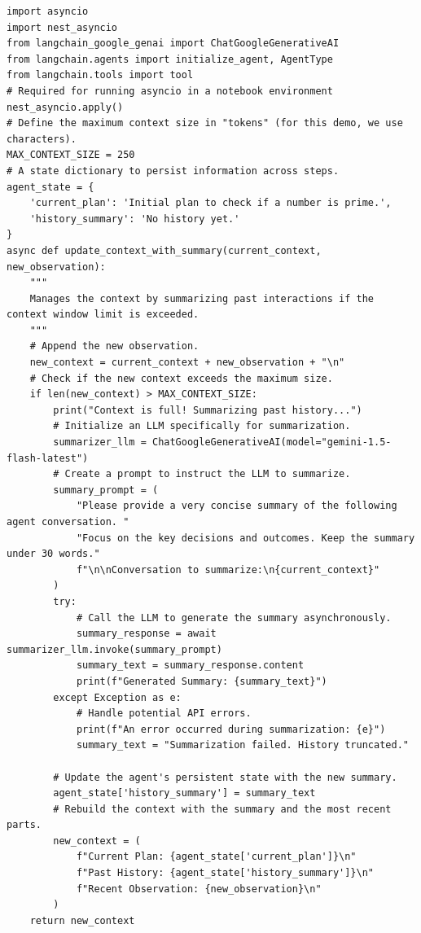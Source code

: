\begin{listing}
\begin{verbatim}
import asyncio
import nest_asyncio
from langchain_google_genai import ChatGoogleGenerativeAI
from langchain.agents import initialize_agent, AgentType
from langchain.tools import tool
# Required for running asyncio in a notebook environment
nest_asyncio.apply()
# Define the maximum context size in "tokens" (for this demo, we use characters).
MAX_CONTEXT_SIZE = 250
# A state dictionary to persist information across steps.
agent_state = {
    'current_plan': 'Initial plan to check if a number is prime.',
    'history_summary': 'No history yet.'
}
async def update_context_with_summary(current_context, new_observation):
    """
    Manages the context by summarizing past interactions if the context window limit is exceeded.
    """
    # Append the new observation.
    new_context = current_context + new_observation + "\n"
    # Check if the new context exceeds the maximum size.
    if len(new_context) > MAX_CONTEXT_SIZE:
        print("Context is full! Summarizing past history...")
        # Initialize an LLM specifically for summarization.
        summarizer_llm = ChatGoogleGenerativeAI(model="gemini-1.5-flash-latest")
        # Create a prompt to instruct the LLM to summarize.
        summary_prompt = (
            "Please provide a very concise summary of the following agent conversation. "
            "Focus on the key decisions and outcomes. Keep the summary under 30 words."
            f"\n\nConversation to summarize:\n{current_context}"
        )
        try:
            # Call the LLM to generate the summary asynchronously.
            summary_response = await summarizer_llm.invoke(summary_prompt)
            summary_text = summary_response.content
            print(f"Generated Summary: {summary_text}")
        except Exception as e:
            # Handle potential API errors.
            print(f"An error occurred during summarization: {e}")
            summary_text = "Summarization failed. History truncated."

        # Update the agent's persistent state with the new summary.
        agent_state['history_summary'] = summary_text
        # Rebuild the context with the summary and the most recent parts.
        new_context = (
            f"Current Plan: {agent_state['current_plan']}\n"
            f"Past History: {agent_state['history_summary']}\n"
            f"Recent Observation: {new_observation}\n"
        )
    return new_context
\end{verbatim}
    \caption{Simplified implementation of the Model Context Protocol (Part 1).}\label{lst:MCP1}
\end{listing}
